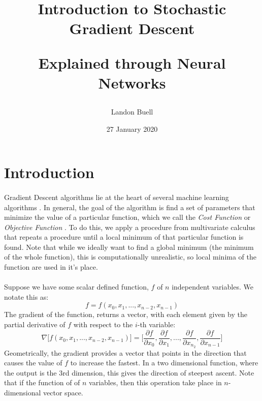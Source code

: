 \documentclass[12pt,letterpaper]{article}
\begin{document}

\title{
\begin{Huge}
Introduction to Stochastic Gradient Descent
\end{Huge} 
\Large Explained through Neural Networks}
\author{Landon Buell}
\date{27 January 2020}
\maketitle


\section{Introduction}
\paragraph*{}Gradient Descent algorithms lie at the heart of several machine learning algorithms \cite{Goodfellow}. In general, the goal of the algorithm is find a set of parameters that minimize the value of a particular function, which we call the \textit{Cost Function} or \textit{Objective Function} \cite{Gareth}. To do this, we apply a procedure from multivariate calculus that repeats a procedure until a local minimum of that particular function is found. Note that while we ideally want to find a global minimum (the minimum of the whole function), this is computationally unrealistic, so local minima of the function are used in it's place. 
\paragraph*{}Suppose we have some scalar defined function, $f$ of $n$ independent variables. We notate this as:
\begin{equation}
\label{f}
f = f(x_0,x_1,...,x_{n-2},x_{n-1})
\end{equation}
The gradient of the function, returns a vector, with each element given by the partial derivative of $f$ with respect to the $i$-th variable:
\begin{equation}
\label{grad f}
\nabla \big[ f(x_0,x_1,...,x_{n-2},x_{n-1}) \big] =
\Big[ \frac{\partial f}{\partial x_0} , \frac{\partial f}{\partial x_1} , ... ,
\frac{\partial f}{\partial x_{n_2}} , \frac{\partial f}{\partial x_{n-1}} \Big]
\end{equation}
Geometrically, the gradient provides a vector that points in the direction that causes the value of $f$ to increase the fastest. In a two dimensional function, where the output is the 3rd dimension, this gives the direction of steepest ascent. Note that if the function of of $n$ variables, then this operation take place in $n$-dimensional vector space.
\end{document}
